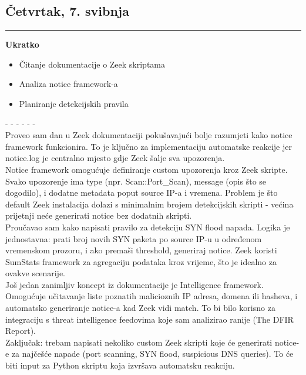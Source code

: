 \documentclass[12pt, a4paper]{article}
\newcommand{\dan}[1]{
    \subsection*{#1}
    \vspace{-0.5em} 
    \hrule \vspace{0.5em} 
}
\begin{document}
\dan{Četvrtak, 7. svibnja}
\textbf{Ukratko}
\begin{itemize}
    \item Čitanje dokumentacije o Zeek skriptama
    \item Analiza notice framework-a
    \item Planiranje detekcijskih pravila
\end{itemize}
- - - - - - \\
Proveo sam dan u Zeek dokumentaciji pokušavajući bolje razumjeti kako notice framework funkcionira. To je ključno za implementaciju automatske reakcije jer notice.log je centralno mjesto gdje Zeek šalje sva upozorenja.
\\
Notice framework omogućuje definiranje custom upozorenja kroz Zeek skripte. Svako upozorenje ima type (npr. Scan::Port\_Scan), message (opis što se dogodilo), i dodatne metadata poput source IP-a i vremena. Problem je što default Zeek instalacija dolazi s minimalnim brojem detekcijskih skripti - većina prijetnji neće generirati notice bez dodatnih skripti.
\\
Proučavao sam kako napisati pravilo za detekciju SYN flood napada. Logika je jednostavna: prati broj novih SYN paketa po source IP-u u određenom vremenskom prozoru, i ako premaši threshold, generiraj notice. Zeek koristi SumStats framework za agregaciju podataka kroz vrijeme, što je idealno za ovakve scenarije.
\\
Još jedan zanimljiv koncept iz dokumentacije je Intelligence framework. Omogućuje učitavanje liste poznatih malicioznih IP adresa, domena ili hasheva, i automatsko generiranje notice-a kad Zeek vidi match. To bi bilo korisno za integraciju s threat intelligence feedovima koje sam analizirao ranije (The DFIR Report).
\\
Zaključak: trebam napisati nekoliko custom Zeek skripti koje će generirati notice-e za najčešće napade (port scanning, SYN flood, suspicious DNS queries). To će biti input za Python skriptu koja izvršava automatsku reakciju.
\end{document}
